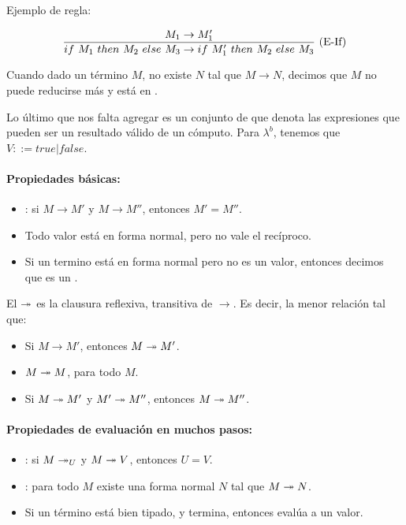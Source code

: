 Ejemplo de regla:

\[\frac{M_1 \to M_1'}{if\ M_1\ then\ M_2\ else\ M_3 \to if\ M_1'\ then\ M_2\ else\ M_3}\ \text{(E-If)}\]

Cuando dado un término $M$, no existe $N$ tal que $M\to N$, decimos que $M$ no puede reducirse más y está en .

Lo último que nos falta agregar es un conjunto de  que denota las expresiones que pueden ser un resultado válido de un cómputo. Para $\lambda^b$, tenemos que $V ::= true \vert false$.

\paragraph{Propiedades básicas:}

\begin{itemize}
  \item {}: si $M \to M'$ y $M \to M''$, entonces $M'= M''$.
  \item Todo valor está en forma normal, pero no vale el recíproco.
  \item Si un termino está en forma normal pero no es un valor, entonces decimos que es un .
\end{itemize}

\noindent
El  $\twoheadrightarrow$ es la clausura reflexiva, transitiva de $\to$. Es decir, la menor relación tal que:

\begin{itemize}
  \item Si $M\to M'$, entonces $M\twoheadrightarrow M'$.
  \item $M\twoheadrightarrow M$, para todo $M$.
  \item Si $M \twoheadrightarrow M'$ y $M' \twoheadrightarrow M''$, entonces $M \twoheadrightarrow M''$.
\end{itemize}

\paragraph{Propiedades de evaluación en muchos pasos:}

\begin{itemize}
  \item {}: si $M \twoheadrightarrow _U$ y $M \twoheadrightarrow V$, entonces $U=V$.
  \item {}: para todo $M$ existe una forma normal $N$ tal que $M \twoheadrightarrow N$.
  \item Si un término está bien tipado, y termina, entonces evalúa a un valor.
\end{itemize}

